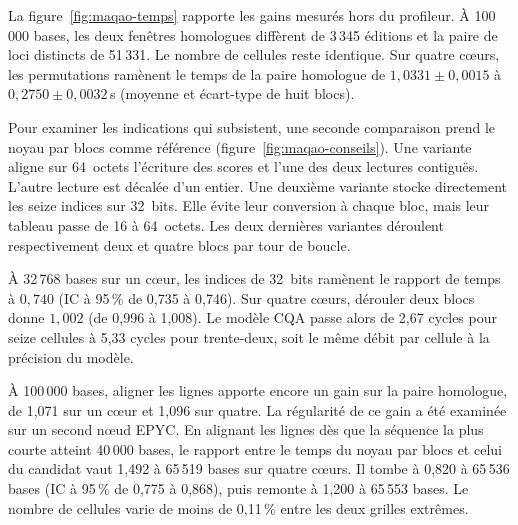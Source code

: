 La figure~\ref{fig:maqao-temps} rapporte les gains mesurés hors du profileur. À 100\,000 bases, les deux fenêtres homologues diffèrent de 3\,345 éditions et la paire de loci distincts de 51\,331. Le nombre de cellules reste identique. Sur quatre cœurs, les permutations ramènent le temps de la paire homologue de \(1{,}0331\pm0{,}0015\) à \(0{,}2750\pm0{,}0032\)\,s (moyenne et écart-type de huit blocs).

Pour examiner les indications qui subsistent, une seconde comparaison prend le noyau par blocs comme référence (figure~\ref{fig:maqao-conseils}). Une variante aligne sur 64~octets l’écriture des scores et l’une des deux lectures contiguës. L’autre lecture est décalée d’un entier. Une deuxième variante stocke directement les seize indices sur 32~bits. Elle évite leur conversion à chaque bloc, mais leur tableau passe de 16 à 64~octets. Les deux dernières variantes déroulent respectivement deux et quatre blocs par tour de boucle.

À 32\,768 bases sur un cœur, les indices de 32~bits ramènent le rapport de temps à \(0{,}740\) (IC à 95\,\% de 0,735 à 0,746). Sur quatre cœurs, dérouler deux blocs donne \(1{,}002\) (de 0,996 à 1,008). Le modèle CQA passe alors de 2,67 cycles pour seize cellules à 5,33 cycles pour trente-deux, soit le même débit par cellule à la précision du modèle.

À 100\,000 bases, aligner les lignes apporte encore un gain sur la paire homologue, de 1,071 sur un cœur et 1,096 sur quatre. La régularité de ce gain a été examinée sur un second nœud EPYC. En alignant les lignes dès que la séquence la plus courte atteint 40\,000 bases, le rapport entre le temps du noyau par blocs et celui du candidat vaut 1,492 à 65\,519 bases sur quatre cœurs. Il tombe à 0,820 à 65\,536 bases (IC à 95\,\% de 0,775 à 0,868), puis remonte à 1,200 à 65\,553 bases. Le nombre de cellules varie de moins de 0,11\,\% entre les deux grilles extrêmes.

